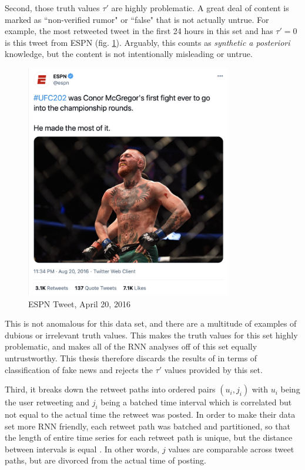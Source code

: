 \documentclass[preprint,review,12pt]{elsarticle}
\begin{document}
Second, those truth values $\tau'$ are highly problematic. A great deal of content is marked as ``non-verified rumor" or ``false" that is not actually untrue. For example, the most retweeted tweet in the first 24 hours in this set and has $\tau' = 0$ is this tweet from ESPN (fig. \ref{fig:ESPN Tweet, April 20, 2016}). Arguably, this counts as \textit{synthetic a posteriori} knowledge, but the content is not intentionally misleading or untrue. 
 \begin{figure}[h!]
    \centering
    \includegraphics[width=9cm]{espn Mcgregor tweet.png}
    \caption{ESPN Tweet, April 20, 2016 \cite{espn2016tweet}}
    \label{fig:ESPN Tweet, April 20, 2016}
\end{figure}

This is not anomalous for this data set, and there are a multitude of examples of dubious or irrelevant truth values. This makes the truth values for this set highly problematic, and makes all of the RNN analyses off of this set equally untrustworthy. This thesis therefore discards the results of \citep{liu2018early,ma2017detect,ma2016detecting,khoo2020interpretable,liu2019early,huang2019deep} in terms of classification of fake news and rejects the $\tau'$ values provided by this set.

Third, it breaks down the retweet paths into ordered pairs $(u_i,j_i)$ with $u_i$ being the user retweeting and $j_i$ being a batched time interval which is correlated but not equal to the actual time the retweet was posted. In order to make their data set more RNN friendly, each retweet path was batched and partitioned, so that the length of entire time series for each retweet path is unique, but the distance between intervals is equal \citep{shu2017fake}. In other words, $j$ values are comparable across tweet paths, but are divorced from the actual time of posting.
\end{document}
